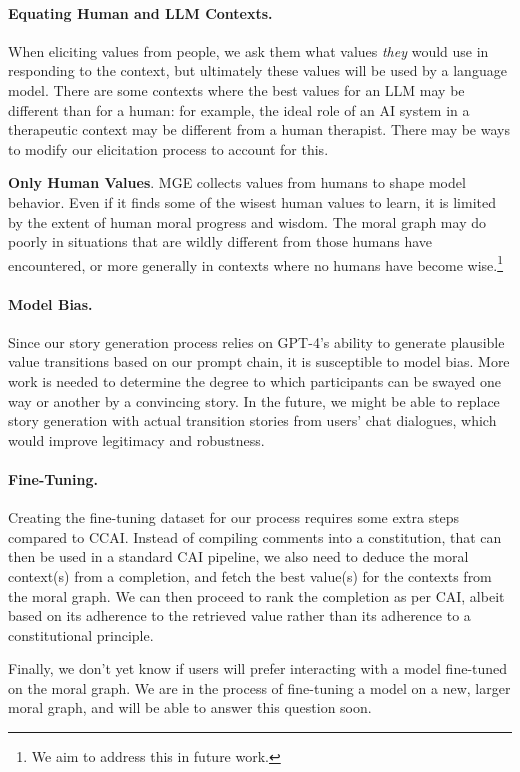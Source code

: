 \documentclass{article}
\theoremstyle{definition}
\begin{document}
\paragraph{Equating Human and LLM Contexts.} When eliciting values from people, we ask them what values \textit{they} would use in responding to the context, but ultimately these values will be used by a language model. There are some contexts where the best values for an LLM may be different than for a human: for example, the ideal role of an AI system in a therapeutic context may be different from a human therapist. There may be ways to modify our elicitation process to account for this.

\textbf{Only Human Values}. MGE collects values from humans to shape model behavior. Even if it finds some of the wisest human values to learn, it is limited by the extent of human moral progress and wisdom. The moral graph may do poorly in situations that are wildly different from those humans have encountered, or more generally in contexts where no humans have become wise.\footnote{We aim to address this in future work.}

\paragraph{Model Bias.} Since our story generation process relies on GPT-4's ability to generate plausible value transitions based on our prompt chain, it is susceptible to model bias. More work is needed to determine the degree to which participants can be swayed one way or another by a convincing story. In the future, we might be able to replace story generation with actual transition stories from users' chat dialogues, which would improve legitimacy and robustness.
 
\paragraph{Fine-Tuning.} Creating the fine-tuning dataset for our process requires some extra steps compared to CCAI. Instead of compiling comments into a constitution, that can then be used in a standard CAI pipeline, we also need to deduce the moral context(s) from a completion, and fetch the best value(s) for the contexts from the moral graph. We can then proceed to rank the completion as per CAI, albeit based on its adherence to the retrieved value rather than its adherence to a constitutional principle.

Finally, we don’t yet know if users will prefer interacting with a model fine-tuned on the moral graph. We are in the process of fine-tuning a model on a new, larger moral graph, and will be able to answer this question soon.
\end{document}
